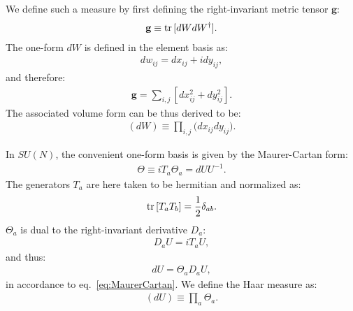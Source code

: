\documentclass[12pt]{article}
\begin{document}
We define such a measure by
first defining the right-invariant metric tensor $\textbf{g}$:
\begin{align}
  \textbf{g}
  \equiv
  {\rm tr}\, [dW dW^\dagger].
\end{align}
The one-form $dW$ is defined in the element basis as:
\begin{align}
  dw_{ij} = dx_{ij} + i dy_{ij},
\end{align}
and therefore:
\begin{align}
  \textbf{g}
  =
  \sum_{i,j}[dx_{ij}^2 + dy_{ij}^2].
\end{align}
The associated volume form can be thus derived to be:
\begin{align}
  (dW)
  \equiv
  \prod_{i,j}
  \big(
  dx_{ij} dy_{ij}
  \big).
  \label{eq:measure_flat}
\end{align}

In $SU(N)$, the convenient one-form basis
is given by the Maurer-Cartan form:
\begin{align}
  \Theta \equiv i T_a \Theta_a = dU U^{-1}. \label{eq:MaurerCartan}
\end{align}
The generators $T_a$ are here taken to be hermitian and normalized as:
\begin{align}
  {\rm tr}\,[T_a T_b] = \frac{1}{2} \delta_{ab}.
\end{align}
$\Theta_a$ is dual to the right-invariant derivative $D_a$:
\begin{align}
  D_a U = i T_a U,
\end{align}
and thus:
\begin{align}
  dU = \Theta_a D_a U,
\end{align}
in accordance to eq.~\eqref{eq:MaurerCartan}.
We define the Haar measure as:
\begin{align}
  (dU) \equiv \prod_a \Theta_a.
\end{align}
\end{document}

